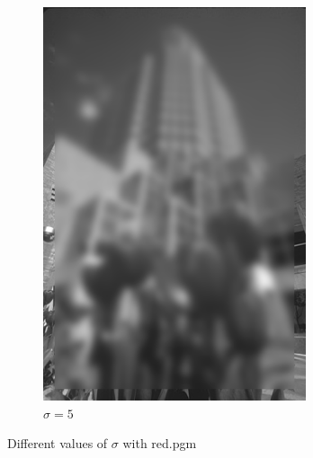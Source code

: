 \documentclass{article}
\begin{document}
\begin{figure}[!h]
\begin{subfigure}[b]{0.3\textwidth}
    \includegraphics[width=0.85\textwidth]{redsig5}
    \caption{$\sigma = 5$}
    \label{fig:f2}
  \end{subfigure} 
  \caption{Different values of $\sigma$ with red.pgm}
\end{figure}
\end{document}
